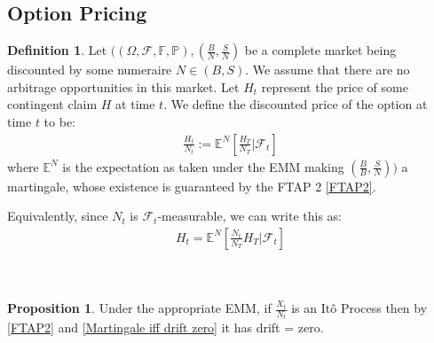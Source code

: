\documentclass{article}
\theoremstyle{definition}
\newtheorem{definition}{Definition}[section]
\newtheorem{proposition}{Proposition}
\begin{document}
\subsection{Option Pricing}
\begin{definition}
Let $((\Omega, \mathcal{F}, \mathbb{F}, \mathbb{P}), (\frac{B}{N},\frac{S}{N})$ be a complete market being discounted by some numeraire $N \in (B,S)$. We assume that there are no arbitrage opportunities in this market. Let $H_{t}$ represent the price of some contingent claim $H$ at time $t$. We define the discounted price of the option at time $t$ to be: 
\begin{align}
   \frac{H_t}{N_t} :=  \mathbb{E}^N\left[\frac{H_{T}}{N_T} | \mathcal{F}_{t}\right]
\end{align}
where $\mathbb{E}^N$ is the expectation as taken under the EMM making $(\frac{B}{B},\frac{S}{N}))$ a martingale, whose existence is guaranteed by the FTAP 2 \ref{FTAP2}.
\end{definition}
\noindent
Equivalently, since $N_t$ is $\mathcal{F}_t$-measurable, we can write this as:
\label{option price definition}
\begin{align}
    H_t = \mathbb{E}^N\left[\frac{N_{t}}{N_T} H_T | \mathcal{F}_{t}\right]
\end{align}
\\\\
\begin{proposition}
    Under the appropriate EMM, if $\frac{X_{t}}{N_t}$ is an Itô Process then by \ref{FTAP2} and \ref{Martingale iff drift zero} it has drift = zero.
\end{proposition}
\end{document}
